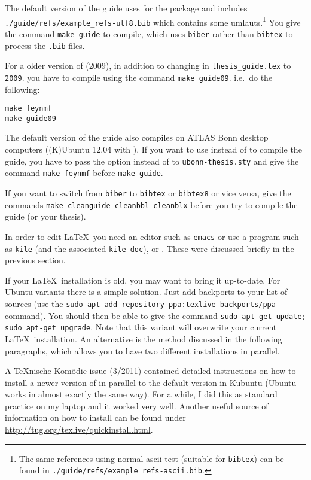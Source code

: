The default version of the guide uses  for the
 package and includes\\
\texttt{./guide/refs/example\_refs-utf8.bib} which contains some umlauts.\footnote{%
The same references using normal ascii test (suitable for \texttt{bibtex}) can be found in
\texttt{./guide/refs/example\_refs-ascii.bib}.}
You give the command \texttt{make guide} to compile, which uses \texttt{biber} rather than
\texttt{bibtex} to process the \texttt{.bib} files.

For a older version of \TeXLive (2009), in addition to changing
 in \texttt{thesis\_guide.tex} to \texttt{2009}.
you have to compile using the command \texttt{make guide09}.
i.e.\ do the following:
\begin{verbatim}
make feynmf
make guide09
\end{verbatim}

The default version of the guide also compiles on ATLAS Bonn desktop
computers ((K)Ubuntu 12.04 with ). If you want to use
 instead of  to compile the guide, you
have to pass the option  instead of  to \texttt{ubonn-thesis.sty} 
and give the command \texttt{make feynmf} before \texttt{make guide}.

If you want to switch from \texttt{biber} to
\texttt{bibtex} or \texttt{bibtex8} or vice versa, give the commands
\texttt{make cleanguide cleanbbl cleanblx} before you try to compile
the guide (or your thesis).

In order to edit \LaTeX\ you need an editor such as \texttt{emacs} or
use a program such as \texttt{kile} (and the associated
\texttt{kile-doc}), \TeXstudio or \TeXmaker. These were discussed
briefly in the previous section.

If your \LaTeX\ installation is old, you may want to bring it
up-to-date.  For Ubuntu variants there is a simple solution. Just add
\TeXLive backports to your list of sources (use the \texttt{sudo
  apt-add-repository ppa:texlive-backports/ppa} command). You should
then be able to give the command \texttt{sudo apt-get update; sudo
  apt-get upgrade}. Note that this variant will overwrite your current
\LaTeX\ installation. An alternative is the method discussed in the
following paragraphs, which allows you to have two different installations in
parallel.

A \TeX nische Komödie issue (3/2011) contained detailed instructions on
how to install a newer version of \TeXLive in parallel to the
default version in Kubuntu (Ubuntu works in almost exactly the
same way). 
For a while, I did this as standard practice on my laptop and it worked very well.
Another useful source of information on how to install \TeXLive can be found under
\url{http://tug.org/texlive/quickinstall.html}.

